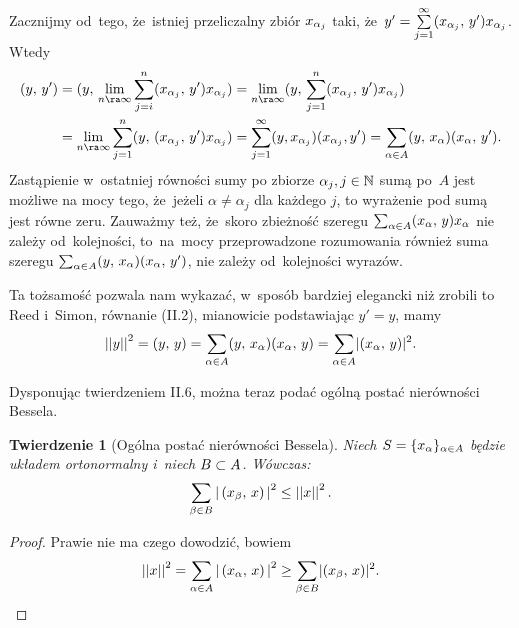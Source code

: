 \documentclass[a4paper,11pt]{article}
\newtheorem{twr}{Twierdzenie} %
\begin{document}
Zacznijmy od~tego, że~istniej przeliczalny zbiór $x_{ \alpha_{ j } }$
taki,
że~$y' = \sum\limits_{ j = 1 }^{ \infty } (  x_{ \alpha_{ j } } , \,  y'  ) x_{
  \alpha_{ j } }$. Wtedy
\begin{equation*}
  \begin{split}
    \SP{ y }{ y' } &= \SP{ y }{ \Lim_{ n \ra \infty } \Sum_{ j = i }^{
        n } \SP{ x_{ \al_{ j } } }{ y' } x_{ \al_{ j } } } = \Lim_{ n
      \ra \infty } \SP{ y }{ \Sum_{ j = 1 }^{ n } \SP{ x_{ \al_{ j } }
      }
      { y' } x_{ \al_{ j } } } \\
    &= \Lim_{ n \ra \infty } \Sum_{ j = 1 }^{ n } \SP{ y }{ \SP{ x_{
          \al_{ j } } }{ y' } x_{ \al_{ j } } } = \sum_{ j = 1 }^{
      \infty } ( y, x_{ \al_{ j } } ) ( x_{ \al_{ j } }, y' ) = \Sum_{
      \al \in A } \SP{ y }{ x_{ \al } } \SP{ x_{ \al } }{ y' }.
  \end{split}
\end{equation*}
Zastąpienie w~ostatniej równości sumy po zbiorze
$\alpha_{ j }, j \in \mathbb{N}$ sumą po~$A$ jest możliwe na mocy tego,
że~jeżeli $\alpha \neq \alpha_{ j }$ dla każdego $j$, to wyrażenie pod
sumą jest równe zeru. Zauważmy też, że~skoro zbieżność szeregu
$\sum_{ \alpha \in A } (  x_{ \alpha } , \,  y  ) x_{ \alpha }$ nie zależy
od~kolejności, to~na~mocy przeprowadzone rozumowania również suma
szeregu
$\sum_{ \alpha \in A } (  y , \,  x_{ \alpha }  ) (  x_{ \alpha } , \,  y'  )$, nie
zależy od~kolejności wyrazów.

Ta tożsamość pozwala nam wykazać, w~sposób bardziej elegancki niż
zrobili to Reed i~Simon, równanie (II.2), mianowicie podstawiając
$y' = y$, mamy
\begin{equation*}
  \left|\left|  y  \right|\right|^{ 2 } = (  y , \,  y  ) = \sum\limits_{ \alpha \in A } (  y , \,  x_{ \alpha }  )
  (  x_{ \alpha } , \,  y  ) = \sum\limits_{ \alpha \in A } \lvert  (  x_{ \alpha } , \,  y  )  \rvert^{ 2 }.
\end{equation*}

\vspace{\spaceFour}


\start {} Dysponując twierdzeniem II.6, można teraz podać ogólną
postać nierówności Bessela.

\begin{twr}[Ogólna postać nierówności Bessela]
  Niech $S = \{ x_{ \alpha } \}_{ \alpha \in A }$ będzie układem
  ortonormalny i~niech $B \subset A$. Wówczas:
  \begin{equation*}
    \sum\limits_{ \beta \in B } \left| \,  (  x_{ \beta }, \,  x  )  \, \right|^{ 2 } \leq \left|\left|  x  \right|\right|^{ 2 }.
  \end{equation*}
\end{twr}
\begin{proof}
  Prawie nie ma czego dowodzić, bowiem
  \begin{equation*}
    \left|\left|  x  \right|\right|^{ 2 } = \sum\limits_{ \alpha \in A } \left| \,  (  x_{ \alpha } , \,  x  )  \, \right|^{ 2 }
    \geq \sum\limits_{ \beta \in B } \lvert  (  x_{ \beta }, \,  x  )  \rvert^{ 2 }.
  \end{equation*}
\end{proof}
\end{document}
